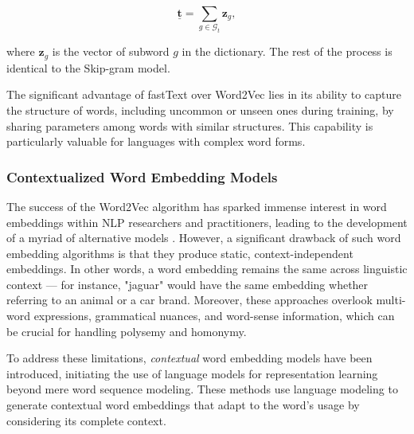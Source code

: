 \begin{equation}
    \bm{\underline{t}} = \sum_{g \in \mathcal{G}_t} \bm{z}_g,
\end{equation}

\noindent where $\bm{z}_g$ is the vector of subword $g$ in the dictionary. The rest of the process is identical to the Skip-gram model.

The significant advantage of fastText over Word2Vec lies in its ability to capture the structure of words, including uncommon or unseen ones during training, by sharing parameters among words with similar structures. This capability is particularly valuable for languages with complex word forms.

\subsubsection{Contextualized Word Embedding Models}


The success of the Word2Vec algorithm \citep{mikolov2013efficient} has sparked immense interest in word embeddings within \ac{NLP} researchers and practitioners, leading to the development of a myriad of alternative models \citep{pennington2014glove, shazeer2016swivel, bojanowski2017enriching}. However, a significant drawback of such word embedding algorithms is that they produce static, context-independent embeddings. In other words, a word embedding remains the same across linguistic context — for instance, "jaguar" would have the same embedding whether referring to an animal or a car brand. Moreover, these approaches overlook multi-word expressions, grammatical nuances, and word-sense information, which can be crucial for handling polysemy and homonymy.

To address these limitations, \textit{contextual} word embedding models have been introduced, initiating the use of language models for representation learning beyond mere word sequence modeling. These methods use language modeling to generate contextual word embeddings that adapt to the word's usage by considering its complete context. 

